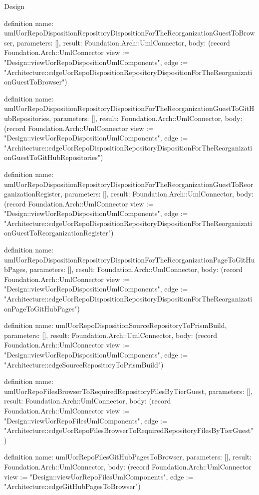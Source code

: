 \begin{lexlean}{Design}
\begin{semanticmodule}
definition{
  name: umlUorRepoDispositionRepositoryDispositionForTheReorganizationGuestToBrowser,
  parameters: [],
  result: Foundation.Arch::UmlConnector,
  body: (record Foundation.Arch::UmlConnector {view := "Design::viewUorRepoDispositionUmlComponents", edge := "Architecture::edgeUorRepoDispositionRepositoryDispositionForTheReorganizationGuestToBrowser"})
}

definition{
  name: umlUorRepoDispositionRepositoryDispositionForTheReorganizationGuestToGitHubRepositories,
  parameters: [],
  result: Foundation.Arch::UmlConnector,
  body: (record Foundation.Arch::UmlConnector {view := "Design::viewUorRepoDispositionUmlComponents", edge := "Architecture::edgeUorRepoDispositionRepositoryDispositionForTheReorganizationGuestToGitHubRepositories"})
}

definition{
  name: umlUorRepoDispositionRepositoryDispositionForTheReorganizationGuestToReorganizationRegister,
  parameters: [],
  result: Foundation.Arch::UmlConnector,
  body: (record Foundation.Arch::UmlConnector {view := "Design::viewUorRepoDispositionUmlComponents", edge := "Architecture::edgeUorRepoDispositionRepositoryDispositionForTheReorganizationGuestToReorganizationRegister"})
}

definition{
  name: umlUorRepoDispositionRepositoryDispositionForTheReorganizationPageToGitHubPages,
  parameters: [],
  result: Foundation.Arch::UmlConnector,
  body: (record Foundation.Arch::UmlConnector {view := "Design::viewUorRepoDispositionUmlComponents", edge := "Architecture::edgeUorRepoDispositionRepositoryDispositionForTheReorganizationPageToGitHubPages"})
}

definition{
  name: umlUorRepoDispositionSourceRepositoryToPrismBuild,
  parameters: [],
  result: Foundation.Arch::UmlConnector,
  body: (record Foundation.Arch::UmlConnector {view := "Design::viewUorRepoDispositionUmlComponents", edge := "Architecture::edgeSourceRepositoryToPrismBuild"})
}

definition{
  name: umlUorRepoFilesBrowserToRequiredRepositoryFilesByTierGuest,
  parameters: [],
  result: Foundation.Arch::UmlConnector,
  body: (record Foundation.Arch::UmlConnector {view := "Design::viewUorRepoFilesUmlComponents", edge := "Architecture::edgeUorRepoFilesBrowserToRequiredRepositoryFilesByTierGuest"})
}

definition{
  name: umlUorRepoFilesGitHubPagesToBrowser,
  parameters: [],
  result: Foundation.Arch::UmlConnector,
  body: (record Foundation.Arch::UmlConnector {view := "Design::viewUorRepoFilesUmlComponents", edge := "Architecture::edgeGitHubPagesToBrowser"})
}


\end{semanticmodule}
\end{lexlean}
